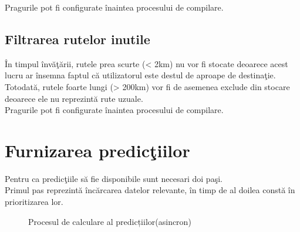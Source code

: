 Pragurile pot fi configurate înaintea procesului de compilare.


	\subsection{Filtrarea rutelor inutile}
	În timpul învăţării, rutele prea scurte (< 2km) nu vor fi stocate deoarece acest lucru ar însemna faptul că utilizatorul este destul de aproape de destinaţie.
	\vspace{6pt}
  \\Totodată, rutele foarte lungi (> 200km) vor fi de asemenea exclude din stocare deoarece ele nu reprezintă rute uzuale.
	\vspace{6pt}
  \\Pragurile pot fi configurate înaintea procesului de compilare.

\clearpage 

\section{Furnizarea predicţiilor} 
Pentru ca predicţiile să fie disponibile sunt necesari doi paşi.
\vspace{6pt}
\\Primul pas reprezintă încărcarea datelor relevante, în timp de al doilea constă în prioritizarea lor.

	\begin{figure}[h!]
   \centering
   \caption{Procesul de calculare al predicțiilor(asincron)}
   \end{figure}	


